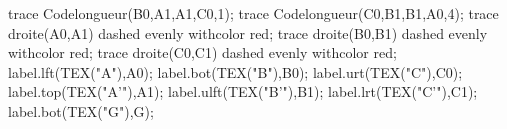 \begin{changemargin}{0mm}{-15mm}
\begin{minipage}{0.4\linewidth}
\begin{Geometrie}[CoinHD={(6.5u,4u)}]
            trace Codelongueur(B0,A1,A1,C0,1);
            trace Codelongueur(C0,B1,B1,A0,4);
            trace droite(A0,A1) dashed evenly withcolor red;
            trace droite(B0,B1) dashed evenly withcolor red;
            trace droite(C0,C1) dashed evenly withcolor red;
            label.lft(TEX("A"),A0);
            label.bot(TEX("B"),B0);
            label.urt(TEX("C"),C0);
            label.top(TEX("A'"),A1);
            label.ulft(TEX("B'"),B1);
            label.lrt(TEX("C'"),C1);
            label.bot(TEX("G"),G);
        \end{Geometrie}
    \end{minipage}
\end{changemargin}


